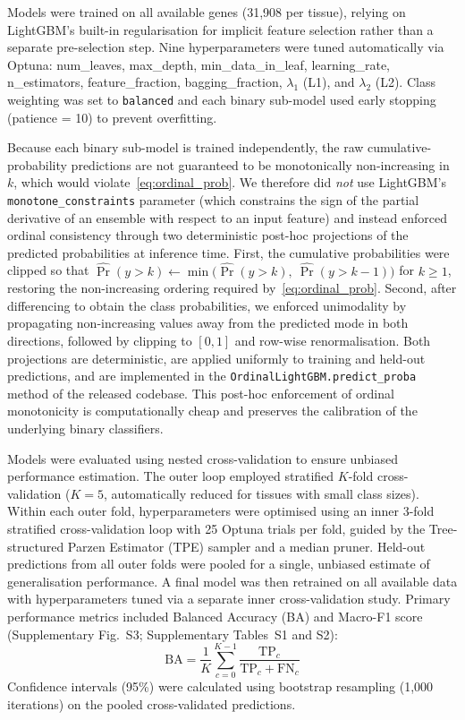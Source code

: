 \documentclass[10pt,a4paper]{article}
\begin{document}
Models were trained on all available genes (31,908 per tissue), relying on LightGBM's built-in regularisation for implicit feature selection rather than a separate pre-selection step. Nine hyperparameters were tuned automatically via Optuna\cite{akiba_optuna_2019}: num\_leaves, max\_depth, min\_data\_in\_leaf, learning\_rate, n\_estimators, feature\_fraction, bagging\_fraction, $\lambda_1$ (L1), and $\lambda_2$ (L2). Class weighting was set to \texttt{balanced} and each binary sub-model used early stopping (patience = 10) to prevent overfitting.

Because each binary sub-model is trained independently, the raw cumulative-probability predictions are not guaranteed to be monotonically non-increasing in $k$, which would violate~\eqref{eq:ordinal_prob}. We therefore did \emph{not} use LightGBM's \texttt{monotone\_constraints} parameter (which constrains the sign of the partial derivative of an ensemble with respect to an input feature) and instead enforced ordinal consistency through two deterministic post-hoc projections of the predicted probabilities at inference time. First, the cumulative probabilities were clipped so that $\widehat{\Pr}(y > k) \leftarrow \min\bigl(\widehat{\Pr}(y > k),\ \widehat{\Pr}(y > k-1)\bigr)$ for $k \geq 1$, restoring the non-increasing ordering required by~\eqref{eq:ordinal_prob}. Second, after differencing to obtain the class probabilities, we enforced unimodality by propagating non-increasing values away from the predicted mode in both directions, followed by clipping to $[0,1]$ and row-wise renormalisation. Both projections are deterministic, are applied uniformly to training and held-out predictions, and are implemented in the \texttt{OrdinalLightGBM.predict\_proba} method of the released codebase. This post-hoc enforcement of ordinal monotonicity is computationally cheap and preserves the calibration of the underlying binary classifiers.

Models were evaluated using nested cross-validation to ensure unbiased performance estimation. The outer loop employed stratified $K$-fold cross-validation ($K = 5$, automatically reduced for tissues with small class sizes). Within each outer fold, hyperparameters were optimised using an inner 3-fold stratified cross-validation loop with 25 Optuna trials per fold, guided by the Tree-structured Parzen Estimator (TPE) sampler and a median pruner. Held-out predictions from all outer folds were pooled for a single, unbiased estimate of generalisation performance. A final model was then retrained on all available data with hyperparameters tuned via a separate inner cross-validation study. Primary performance metrics included Balanced Accuracy (BA) and Macro-F1 score (Supplementary Fig.~S3; Supplementary Tables~S1 and S2):
\begin{equation}
\mathrm{BA} = \frac{1}{K} \sum_{c=0}^{K-1} \frac{\mathrm{TP}_c}{\mathrm{TP}_c + \mathrm{FN}_c}
\label{eq:ba}
\end{equation}
Confidence intervals (95\%) were calculated using bootstrap resampling (1,000 iterations) on the pooled cross-validated predictions.
\end{document}
